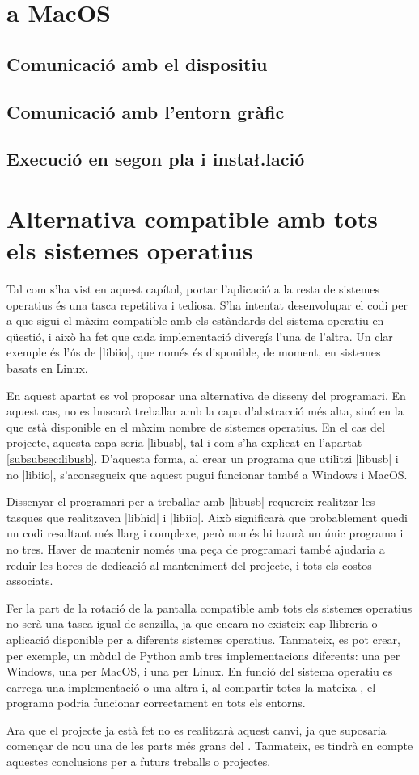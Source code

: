 \section{ a MacOS}
\subsection{Comunicació amb el dispositiu}
\subsection{Comunicació amb l'entorn gràfic}
\subsection{Execució en segon pla i insta\l.lació}


\section{Alternativa compatible amb tots els sistemes operatius}
\label{sec:winmac-conclusions}

Tal com s'ha vist en aquest capítol, portar l'aplicació a la resta de sistemes
operatius és una tasca repetitiva i tediosa. S'ha intentat desenvolupar el codi
per a que sigui el màxim compatible amb els estàndards del sistema operatiu en
qüestió, i això ha fet que cada implementació divergís l'una de l'altra. Un clar
exemple és l'ús de \ord|libiio|, que només és disponible, de moment, en sistemes
basats en Linux.

En aquest apartat es vol proposar una alternativa de disseny del programari. En
aquest cas, no es buscarà treballar amb la capa d'abstracció més alta, sinó en
la que està disponible en el màxim nombre de sistemes operatius. En el cas del
projecte, aquesta capa seria \ord|libusb|, tal i com s'ha explicat en l'apartat
\ref{subsubsec:libusb}. D'aquesta forma, al crear un programa que utilitzi
\ord|libusb| i no \ord|libiio|, s'aconsegueix que aquest pugui funcionar també
a Windows i MacOS.

Dissenyar el programari per a treballar amb \ord|libusb| requereix realitzar
les tasques que realitzaven \ord|libhid| i \ord|libiio|. Això significarà que
probablement quedi un codi resultant més llarg i complexe, però només hi haurà
un únic programa i no tres. Haver de mantenir només una peça de programari
també ajudaria a reduir les hores de dedicació al manteniment del projecte, i
tots els costos associats.

Fer la part de la rotació de la pantalla compatible amb tots els sistemes
operatius no serà una tasca igual de senzilla, ja que encara no existeix cap
llibreria o aplicació disponible per a diferents sistemes operatius. Tanmateix,
es pot crear, per exemple, un mòdul de Python amb tres implementacions
diferents: una per Windows, una per MacOS, i una per Linux. En funció del
sistema operatiu es carrega una implementació o una altra i, al compartir
totes la mateixa , el programa podria funcionar correctament en tots
els entorns.

Ara que el projecte ja està fet no es realitzarà aquest canvi, ja que suposaria
començar de nou una de les parts més grans del . Tanmateix, es tindrà
en compte aquestes conclusions per a futurs treballs o projectes.
